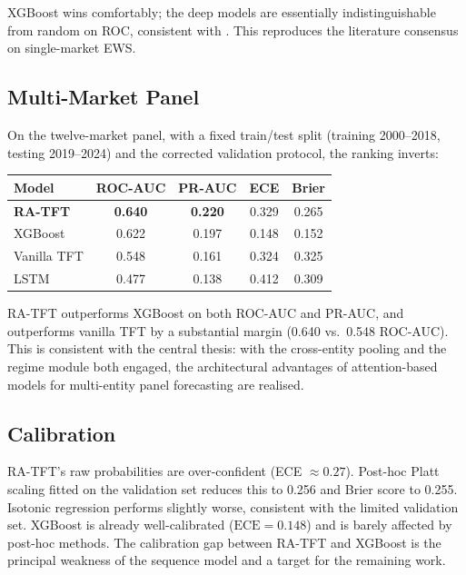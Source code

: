 \documentclass[11pt,a4paper]{article}
\begin{document}
XGBoost wins comfortably; the deep models are essentially indistinguishable
from random on ROC, consistent with \citet{bluwstein2023credit}. This
reproduces the literature consensus on single-market EWS.

\subsection{Multi-Market Panel}
On the twelve-market panel, with a fixed train/test split (training
2000--2018, testing 2019--2024) and the corrected validation protocol, the
ranking inverts:
\vspace{2pt}
\begin{center}
\small
\begin{tabular}{lcccc}
\toprule
Model & ROC-AUC & PR-AUC & ECE & Brier \\
\midrule
\textbf{RA-TFT}    & \textbf{0.640} & \textbf{0.220} & 0.329 & 0.265 \\
XGBoost            & 0.622 & 0.197 & 0.148 & 0.152 \\
Vanilla TFT        & 0.548 & 0.161 & 0.324 & 0.325 \\
LSTM               & 0.477 & 0.138 & 0.412 & 0.309 \\
\bottomrule
\end{tabular}
\end{center}

RA-TFT outperforms XGBoost on both ROC-AUC and PR-AUC, and outperforms
vanilla TFT by a substantial margin (0.640 vs.\ 0.548 ROC-AUC). This is
consistent with the central thesis: with the cross-entity pooling and the
regime module both engaged, the architectural advantages of attention-based
models for multi-entity panel forecasting are realised.

\subsection{Calibration}
RA-TFT's raw probabilities are over-confident (ECE $\approx 0.27$). Post-hoc
Platt scaling fitted on the validation set reduces this to 0.256 and Brier
score to 0.255. Isotonic regression performs slightly worse, consistent
with the limited validation set. XGBoost is already well-calibrated
($\text{ECE}=0.148$) and is barely affected by post-hoc methods. The
calibration gap between RA-TFT and XGBoost is the principal weakness of the
sequence model and a target for the remaining work.
\end{document}
